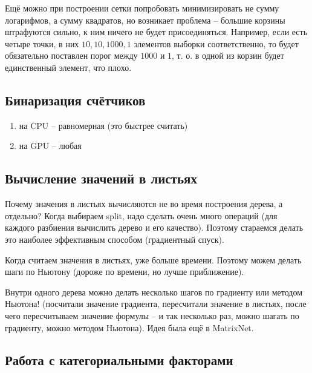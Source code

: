 \documentclass[a4paper,12pt]{article}
\begin{document}
Ещё можно при построении сетки попробовать минимизировать не сумму логарифмов, а сумму квадратов, но возникает проблема -- большие корзины штрафуются сильно, к ним ничего не будет присоединяться.
Например, если есть четыре точки, в них $10, 10, 1000, 1$ элементов выборки соответственно, то будет обязательно поставлен порог между $1000$ и $1$, т. о. в одной из корзин будет единственный элемент, что плохо.

\subsection{Бинаризация счётчиков}

\begin{enumerate}[noitemsep]
    \item на CPU -- равномерная (это быстрее считать)
    \item на GPU -- любая
\end{enumerate}

\subsection{Вычисление значений в листьях}

Почему значения в листьях вычисляются не во время построения дерева, а отдельно?
Когда выбираем split, надо сделать очень много операций (для каждого разбиения вычислить дерево и его качество).
Поэтому стараемся делать это наиболее эффективным способом (градиентный спуск).

Когда считаем значения в листьях, уже больше времени.
Поэтому можем делать шаги по Ньютону (дороже по времени, но лучше приближение).

Внутри одного дерева можно делать несколько шагов по градиенту или методом Ньютона! (посчитали значение градиента, пересчитали значение в листьях, после чего пересчитываем значение формулы -- и так несколько раз, можно шагать по градиенту, можно методом Ньютона). Идея была ещё в MatrixNet.

\subsection{Работа с категориальными факторами}
\end{document}
